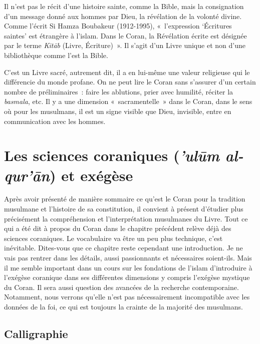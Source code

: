 Il n'est pas le récit d'une histoire sainte, comme la Bible, mais la
consignation d'un message donné aux hommes par Dieu, la révélation de la
volonté divine. Comme l'écrit Si Hamza Boubakeur (1912-1995),
«~l'expression `Écritures saintes' est étrangère à l'islam. Dans le
Coran, la Révélation écrite est désignée par le terme \emph{Kitāb}
(Livre, Écriture)~». Il s'agit
d'un Livre unique et non d'une bibliothèque comme l'est la Bible.

C'est un Livre sacré, autrement dit, il a en lui-même une valeur
religieuse qui le différencie du monde profane. On ne peut lire le Coran
sans s'assurer d'un certain nombre de préliminaires~: faire les
ablutions, prier avec humilité, réciter la \emph{basmala}, etc. Il y a
une dimension «~sacramentelle~» dans le Coran, dans le sens où pour les
musulmans, il est un signe visible que Dieu, invisible, entre en
communication avec les hommes.

\FloatBarrier
\chapter{Les sciences coraniques (\emph{'ulūm al-qur'ān}) et exégèse}

Après avoir présenté de manière sommaire ce qu'est le Coran pour la
tradition musulmane et l'histoire de sa constitution, il convient à
présent d'étudier plus précisément la compréhension et l'interprétation
musulmanes du Livre. Tout ce qui a été dit à propos du Coran dans le
chapitre précédent relève déjà des sciences coraniques. Le vocabulaire
va être un peu plus technique, c'est inévitable. Dites-vous que ce
chapitre reste cependant une introduction. Je ne vais pas rentrer dans
les détails, aussi passionnants et nécessaires soient-ils. Mais il me
semble important dans un cours sur les fondations de l'islam
d'introduire à l'exégèse coranique dans ses différentes dimensions y
compris l'exégèse mystique du Coran. Il sera aussi question des avancées
de la recherche contemporaine. Notamment, nous verrons qu'elle n'est pas
nécessairement incompatible avec les données de la foi, ce qui est
toujours la crainte de la majorité des musulmans.


\section{Calligraphie}

